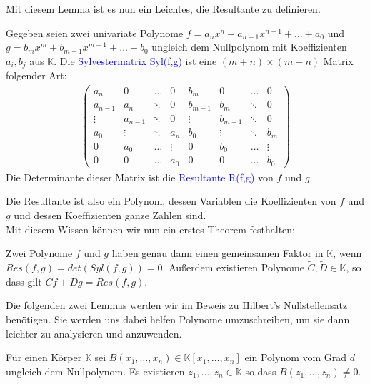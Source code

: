 \noindent Mit diesem Lemma ist es nun ein Leichtes, die Resultante zu definieren.

\begin{definition}
Gegeben seien zwei univariate Polynome $f = a_nx^n+a_{n-1}x^{n-1}+\ldots + a_0$ und $g = b_mx^m+b_{m-1}x^{m-1}+\ldots+b_0$ ungleich dem Nullpolynom mit Koeffizienten $a_i, b_j$ aus $\mathbb{K}$. Die \textcolor{blue}{Sylvestermatrix Syl(f,g)} ist eine $(m+n) \times (m+n)$ Matrix folgender Art:
\begin{align*}
\begin{pmatrix}
a_n & 0 &\dots & 0 & b_m & 0 & \ldots & 0 \\
a_{n-1} & a_n & \ddots & 0 & b_{m-1} & b_m & \ddots & 0 \\
\vdots & a_{n-1} & \ddots & 0 & \vdots & b_{m-1} & \ddots & 0 \\
a_0 & \vdots & \ddots & a_n & b_0 & \vdots & \ddots & b_m\\
0 & a_0 & \dots & \vdots & 0 & b_0 & \dots & \vdots \\
0 & 0 & \dots & a_0 & 0 & 0 & \dots & b_0
\end{pmatrix}
\end{align*}
Die Determinante dieser Matrix ist die \textcolor{blue}{Resultante R(f,g)} von $f$ und $g$. 
\end{definition}

\noindent Die Resultante ist also ein Polynom, dessen Variablen die Koeffizienten von $f$ und $g$ und dessen Koeffizienten ganze Zahlen sind.\\
\noindent Mit diesem Wissen können wir nun ein erstes Theorem festhalten:

\begin{theorem} \label{theorem1239}
Zwei Polynome $f$ und $g$ haben genau dann einen gemeinsamen Faktor in $\mathbb{K}$, wenn $Res(f,g) = det(Syl(f,g)) = 0$. Außerdem existieren Polynome $\tilde{C},\tilde{D} \in \mathbb{K}$, so dass gilt $\tilde{C}f + \tilde{D}g = Res(f,g)$.
\end{theorem}

\noindent Die folgenden zwei Lemmas werden wir im Beweis zu Hilbert's Nullstellensatz benötigen. Sie werden uns dabei helfen Polynome umzuschreiben, um sie dann leichter zu analysieren und anzuwenden.

\begin{lemma}
Für einen Körper $\mathbb{K}$ sei $B(x_1,\ldots,x_n)\in \mathbb{K}[x_1,\ldots,x_n]$ ein Polynom vom Grad $d$ ungleich dem Nullpolynom. Es existieren $z_1,\ldots,z_n \in \mathbb{K}$ so dass $B(z_1,\ldots,z_n) \not = 0$.
\end{lemma}

